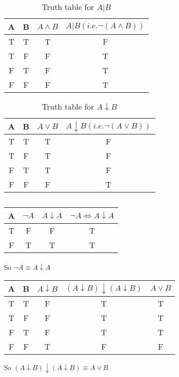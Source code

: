 \documentclass[a4paper,12pt,titlepage]{article}
\begin{document}
\subsection{}
\begin{table}[H]
  \centering
\begin{tabular}{|c|c|c|c|}
\hline
\hline
A & B & $A\wedge B$ & $A|B(i.e. \neg(A\wedge B))$ \\
\hline
T & T & T & F \\
\hline
T & F & F & T \\
\hline
F & T & F & T \\
\hline
F & F & F & T \\
\hline
\hline
\end{tabular}
\caption{Truth table for $A|B$}
\end{table}

\begin{table}[H]
  \centering
\begin{tabular}{|c|c|c|c|}
\hline
\hline
A & B & $A\vee B$ & $A\downarrow B(i.e. \neg(A\vee B))$ \\
\hline
T & T & T & F \\
\hline
T & F & T & F \\
\hline
F & T & T & F \\
\hline
F & F & F & T \\
\hline
\hline
\end{tabular}
\caption{Truth table for $A\downarrow B$}
\end{table}

\subsection{}
\begin{table}[H]
  \centering
\begin{tabular}{|c|c|c|c|}
\hline
\hline
A & $\neg A$ & $A\downarrow A$ & $\neg A\Leftrightarrow A\downarrow A$ \\
\hline
T & F & F & T\\
\hline
F & T & T & T\\
\hline
\hline
\end{tabular}
\end{table}
\paragraph{}So $\neg A\equiv A\downarrow A$
\begin{table}[H]
  \centering
\begin{tabular}{|c|c|c|c|c|}
\hline
\hline
A & B & $A\downarrow B$ & $(A\downarrow B)\downarrow(A\downarrow B)$ & $A\vee B$ \\
\hline
T & T & F & T & T\\
\hline
T & F & F & T & T\\
\hline
F & T & F & T & T\\
\hline
F & F & T & F & F\\
\hline
\hline
\end{tabular}

\end{table}
So $(A\downarrow B)\downarrow(A\downarrow B)\equiv A\vee  B$
\end{document}
